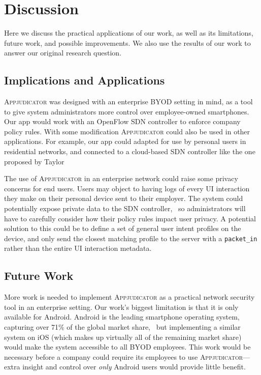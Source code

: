 \section{Discussion}
\label{sec:discussion}

Here we discuss the practical applications of our work, as well as its
limitations, future work, and possible improvements. We also use the results of
our work to answer our original research question.

\subsection{Implications and Applications}
\label{sec:implications-and-applications}

\textsc{Appjudicator} was designed with an enterprise BYOD setting in mind, as a
tool to give system administrators more control over employee-owned smartphones.
Our app would work with an OpenFlow SDN controller to enforce company policy
rules. With some modification \textsc{Appjudicator} could also be used in other
applications. For example, our app could adapted for use by personal users in
residential networks, and connected to a cloud-based SDN controller like the one
proposed by Taylor~\etal\cite{taylor2017shue}

The use of \textsc{Appjudicator} in an enterprise network could raise some
privacy concerns for end users. Users may object to having logs of every UI
interaction they make on their personal device sent to their employer. The
system could potentially expose private data to the SDN
controller,~\cite{kalysch2018} so administrators will have to carefully consider
how their policy rules impact user privacy. A potential solution to this could
be to define a set of general user intent profiles on the device, and only send
the closest matching profile to the server with a \texttt{packet\_in} rather
than the entire UI interaction metadata.

\subsection{Future Work}
\label{sec:future-work}

More work is needed to implement \textsc{Appjudicator} as a practical network
security tool in an enterprise setting. Our work's biggest limitation is that it
is only available for Android. Android is the leading smartphone operating
system, capturing over 71\% of the global market share,~\cite{statcounter2021}
but implementing a similar system on iOS (which makes up virtually all of the
remaining market share) would make the system accessible to all BYOD employees.
This work would be necessary before a company could require its employees to use
\textsc{Appjudicator}---extra insight and control over \textit{only} Android
users would provide little benefit.

